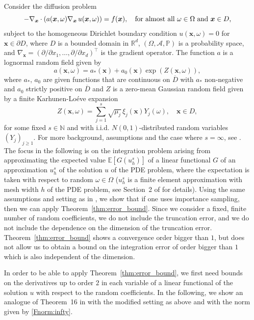 \documentclass[namedate,webpdf,imanum]{ima-authoring-arxiv}%
\theoremstyle{thmstyletwo}%
\numberwithin{equation}{section}
\newcommand{\bsx}{\boldsymbol{x}}
\newcommand{\RR}{\mathbb{R}}
\newcommand{\EE}{\mathbb{E}}
\begin{document}
Consider the diffusion problem
\begin{equation}\label{def:difprobl}
-\nabla_{\bsx} \cdot (a(\bsx, \omega) \nabla_{\bsx} \, u(\bsx, \omega)) = f(\bsx), \quad \mbox{for almost all $ \omega \in \Omega$ and $\bsx \in D$,}
\end{equation}
subject to the homogeneous Dirichlet boundary condition $u(\bsx,\omega) = 0$ for $\bsx \in \partial D$, where $D$ is a bounded domain in $\RR^d$, $(\Omega, \mathcal{A}, \mathbb{P})$ is a probability space, and $\nabla_{\bsx}=(\partial/\partial x_1,\ldots,\partial/\partial x_d)^{\top}$ is the gradient operator. The function $a$ is a lognormal random field given by
\begin{equation*}
a(\bsx, \omega) = a_\ast(\bsx) + a_0(\bsx) \exp(Z(\bsx, \omega)),
\end{equation*}
where $a_\ast$, $a_0$ are given functions that are continuous on $\overline{D}$ with $a_\ast$ non-negative and $a_0$ strictly positive on $\overline{D}$ and $Z$ is a zero-mean Gaussian random field given by a finite Karhunen-Lo\'eve expansion
\begin{equation*}
Z(\bsx, \omega) = \sum_{j=1}^s \sqrt{\mu_j} \, \xi_j(\bsx) Y_j(\omega), \quad \bsx \in D,
\end{equation*} 
for some fixed $s \in \mathbb{N}$ and with i.i.d. $N(0,1)$-distributed random variables $(Y_j)_{j \ge 1}$. For more background, assumptions and the case where $s= \infty$, see \cite{GKNSSS15}. The focus in the following is on the integration problem arising from approximating the expected value $\EE[G(u_h^s)]$ of a linear functional $G$ of an approximation $u_h^s$ of the solution $u$ of the PDE problem, where the expectation is taken with respect to random $\omega \in \Omega$ ($u_h^s$ is a finite element approximation with mesh width $h$ of the PDE problem, see Section~2 of \cite{GKNSSS15} for details). Using the same assumptions and setting as in \cite{GKNSSS15}, we show that if one uses importance sampling, then we can apply Theorem~\ref{thm:error_bound}. Since we consider a fixed, finite number of random coefficients, we do not include the truncation error, and we do not include the dependence on the dimension of the truncation error. Theorem~\ref{thm:error_bound} shows a convergence order bigger than $1$, but does not allow us to obtain a bound on the integration error of order bigger than $1$ which is also independent of the dimension.

In order to be able to apply Theorem~\ref{thm:error_bound}, we first need bounds on the derivatives up to order $2$ in each variable of a linear functional of the solution $u$ with respect to the random coefficients. In the following, we show an analogue of Theorem~16 in \cite{GKNSSS15} with the modified setting as above and with the norm given by \eqref{Fnorm:infty}.
\end{document}
